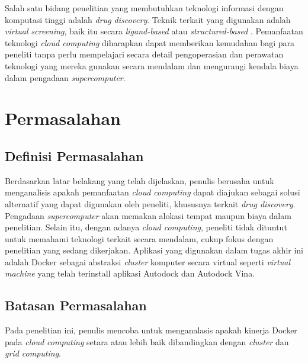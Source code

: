 Salah satu bidang penelitian yang membutuhkan teknologi informasi dengan komputasi
tinggi adalah \textit{drug discovery}. Teknik terkait yang digunakan adalah 
\textit{virtual screening}, baik itu secara \textit{ligand-based} atau \textit{structured-based}
. Pemanfaatan teknologi \textit{cloud computing} diharapkan dapat memberikan kemudahan
bagi para peneliti tanpa perlu mempelajari secara detail pengoperasian dan perawatan teknologi yang mereka gunakan secara mendalam dan mengurangi kendala biaya dalam pengadaan \textit{supercomputer}. 

\section{Permasalahan}
\subsection{Definisi Permasalahan}
Berdasarkan latar belakang yang telah dijelaskan, penulis berusaha untuk menganalisis
apakah pemanfaatan \textit{cloud computing} dapat diajukan sebagai solusi alternatif
yang dapat digunakan oleh peneliti, khususnya terkait \textit{drug discovery}. 
Pengadaan \textit{supercomputer} akan memakan alokasi tempat maupun biaya dalam penelitian.
Selain itu, dengan adanya \textit{cloud computing}, peneliti tidak dituntut untuk memahami
teknologi terkait secara mendalam, cukup fokus dengan penelitian yang sedang dikerjakan. 
Aplikasi yang digunakan dalam tugas akhir ini adalah Docker sebagai abstraksi \textit{cluster}
komputer secara virtual seperti \textit{virtual machine} yang telah terinstall aplikasi Autodock 
dan Autodock Vina.


\subsection{Batasan Permasalahan}
Pada penelitian ini, penulis mencoba untuk menganalasis apakah kinerja Docker pada 
\textit{cloud computing} setara atau lebih baik dibandingkan dengan \textit{cluster} dan 
\textit{grid computing}. 


